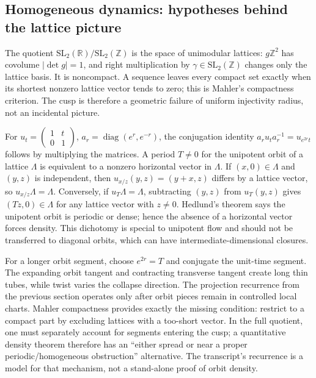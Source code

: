 \subsection{Homogeneous dynamics: hypotheses behind the lattice picture}\label{04-visual-computing-ii-ch033-homogeneous-dynamics-hypotheses-behind-the-lattice-picture}

\hypertarget{04-visual-computing-ii-ch033-homogeneous-dynamics-hypotheses-behind-the-lattice-picture}{}

The quotient \(\mathrm{SL}_2(\mathbb R)/\mathrm{SL}_2(\mathbb Z)\) is the space of unimodular lattices: \(g\mathbb Z^2\) has covolume \(|\det g|=1\), and right multiplication by \(\gamma\in\mathrm{SL}_2(\mathbb Z)\) changes only the lattice basis. It is noncompact. A sequence leaves every compact set exactly when its shortest nonzero lattice vector tends to zero; this is Mahler's compactness criterion. The cusp is therefore a geometric failure of uniform injectivity radius, not an incidental picture.

For \(u_t=\begin{pmatrix}1&t\\0&1\end{pmatrix}\), \(a_r=\operatorname{diag}(e^r,e^{-r})\), the conjugation identity \(a_ru_ta_r^{-1}=u_{e^{2r}t}\) follows by multiplying the matrices. A period \(T\ne0\) for the unipotent orbit of a lattice \(\Lambda\) is equivalent to a nonzero horizontal vector in \(\Lambda\). If \((x,0)\in\Lambda\) and \((y,z)\) is independent, then \(u_{x/z}(y,z)=(y+x,z)\) differs by a lattice vector, so \(u_{x/z}\Lambda=\Lambda\). Conversely, if \(u_T\Lambda=\Lambda\), subtracting \((y,z)\) from \(u_T(y,z)\) gives \((Tz,0)\in\Lambda\) for any lattice vector with \(z\ne0\). Hedlund's theorem says the unipotent orbit is periodic or dense; hence the absence of a horizontal vector forces density. This dichotomy is special to unipotent flow and should not be transferred to diagonal orbits, which can have intermediate-dimensional closures.

For a longer orbit segment, choose \(e^{2r}=T\) and conjugate the unit-time segment. The expanding orbit tangent and contracting transverse tangent create long thin tubes, while twist varies the collapse direction. The projection recurrence from the previous section operates only after orbit pieces remain in controlled local charts. Mahler compactness provides exactly the missing condition: restrict to a compact part by excluding lattices with a too-short vector. In the full quotient, one must separately account for segments entering the cusp; a quantitative density theorem therefore has an ``either spread or near a proper periodic/homogeneous obstruction'' alternative. The transcript's recurrence is a model for that mechanism, not a stand-alone proof of orbit density.

